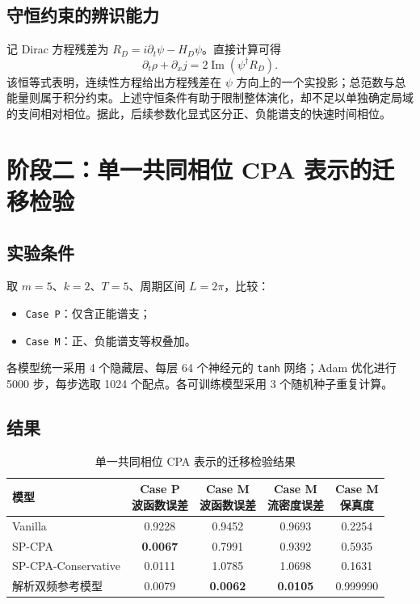 \documentclass[UTF8,a4paper,12pt,fontset=fandol]{ctexart}
\begin{document}
\subsection{守恒约束的辨识能力}

记 Dirac 方程残差为 $R_D=i\partial_t\psi-H_D\psi$。直接计算可得
\begin{equation}
\partial_t\rho+\partial_xj
=2\operatorname{Im}(\psi^\dagger R_D).
\end{equation}
该恒等式表明，连续性方程给出方程残差在 $\psi$ 方向上的一个实投影；总范数与总能量则属于积分约束。上述守恒条件有助于限制整体演化，却不足以单独确定局域的支间相对相位。据此，后续参数化显式区分正、负能谱支的快速时间相位。

\section{阶段二：单一共同相位 CPA 表示的迁移检验}

\subsection{实验条件}

取 $m=5$、$k=2$、$T=5$、周期区间 $L=2\pi$，比较：
\begin{itemize}
  \item \texttt{Case P}：仅含正能谱支；
  \item \texttt{Case M}：正、负能谱支等权叠加。
\end{itemize}
各模型统一采用 4 个隐藏层、每层 64 个神经元的 \texttt{tanh} 网络；Adam 优化进行 5000 步，每步选取 1024 个配点。各可训练模型采用 3 个随机种子重复计算。

\subsection{结果}

\begin{table}[htbp]
\centering
\footnotesize
\caption{单一共同相位 CPA 表示的迁移检验结果}
\begin{tabular}{@{}lcccc@{}}
\toprule
模型 &
\shortstack{Case P\\波函数误差} &
\shortstack{Case M\\波函数误差} &
\shortstack{Case M\\流密度误差} &
\shortstack{Case M\\保真度} \\
\midrule
Vanilla & 0.9228 & 0.9452 & 0.9693 & 0.2254 \\
SP-CPA & \textbf{0.0067} & 0.7991 & 0.9392 & 0.5935 \\
SP-CPA-Conservative & 0.0111 & 1.0785 & 1.0698 & 0.1631 \\
解析双频参考模型 & 0.0079 & \textbf{0.0062} & \textbf{0.0105} & 0.999990 \\
\bottomrule
\end{tabular}
\end{table}
\end{document}
